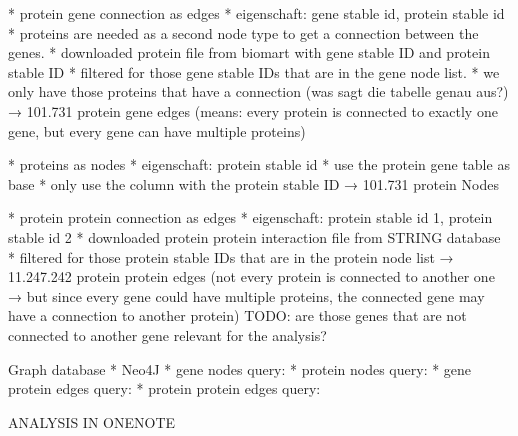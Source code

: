 \documentclass[11pt,a4paper]{article}
\begin{document}
    * protein gene connection as edges
        * eigenschaft: gene stable id, protein stable id
        * proteins are needed as a second node type to get a connection between the genes.
        * downloaded protein file from biomart with gene stable ID and protein stable ID
        * filtered for those gene stable IDs that are in the gene node list.
        * we only have those proteins that have a connection (was sagt die tabelle genau aus?)
    → 101.731 protein gene edges (means: every protein is connected to exactly one gene, but every gene can have multiple proteins)

    * proteins as nodes
        * eigenschaft: protein stable id
        * use the protein gene table as base
        * only use the column with the protein stable ID
    → 101.731 protein Nodes

    * protein protein connection as edges
        * eigenschaft: protein stable id 1, protein stable id 2
        * downloaded protein protein interaction file from STRING database
        * filtered for those protein stable IDs that are in the protein node list
    → 11.247.242 protein protein edges
    (not every protein is connected to another one → but since every gene could have multiple proteins, the connected gene may have a connection to another protein)
    TODO: are those genes that are not connected to another gene relevant for the analysis?

Graph database
    * Neo4J
    * gene nodes query:
    * protein nodes query:
    * gene protein edges query:
    * protein protein edges query:




ANALYSIS
IN ONENOTE


\newpage
\end{document}
